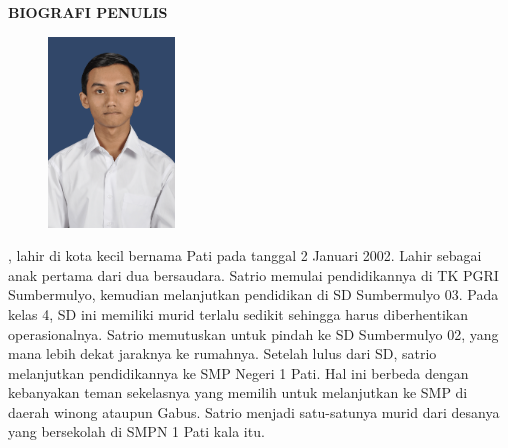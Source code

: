 \begin{center}
  \Large
  \textbf{BIOGRAFI PENULIS}
\end{center}


\vspace{2ex}

\begin{figure}
  \centering
  \vspace{-3ex}
  \includegraphics[width=0.3\textwidth]{gambar/foto diri.png}
  \vspace{-4ex}
\end{figure}

\name{}, lahir di kota kecil bernama Pati pada tanggal 2 Januari 2002. Lahir sebagai anak pertama dari dua bersaudara. Satrio memulai pendidikannya di TK PGRI Sumbermulyo, kemudian melanjutkan pendidikan di SD Sumbermulyo 03. Pada kelas 4, SD ini memiliki murid terlalu sedikit sehingga harus diberhentikan operasionalnya. Satrio memutuskan untuk pindah ke SD Sumbermulyo 02, yang mana lebih dekat jaraknya ke rumahnya. Setelah lulus dari SD, satrio melanjutkan pendidikannya ke SMP Negeri 1 Pati. Hal ini berbeda dengan kebanyakan teman sekelasnya yang memilih untuk melanjutkan ke SMP di daerah winong ataupun Gabus. Satrio menjadi satu-satunya murid dari desanya yang bersekolah di SMPN 1 Pati kala itu.  \lipsum[1-3]
